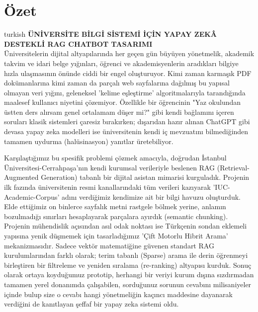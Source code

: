 \documentclass[12pt,a4paper]{report}
\newcommand{\projecttitle}{ÜNİVERSİTE BİLGİ SİSTEMİ İÇİN YAPAY ZEKÂ DESTEKLİ RAG CHATBOT TASARIMI}
\begin{document}
\chapter*{Özet}
\begin{otherlanguage*}{turkish}
\textbf{\projecttitle}\\[0.5cm]

Üniversitelerin dijital altyapılarında her geçen gün büyüyen yönetmelik, akademik takvim ve idari belge yığınları, öğrenci ve akademisyenlerin aradıkları bilgiye hızla ulaşmasının önünde ciddi bir engel oluşturuyor. Kimi zaman karmaşık PDF dokümanlarına kimi zaman da parçalı web sayfalarına dağılmış bu yapısal olmayan veri yığını, geleneksel 'kelime eşleştirme' algoritmalarıyla tarandığında maalesef kullanıcı niyetini çözemiyor. Özellikle bir öğrencinin "Yaz okulundan üstten ders alırsam genel ortalamam düşer mi?" gibi kendi bağlamını içeren soruları klasik sistemleri çaresiz bırakırken; dışarıdan hazır alınan ChatGPT gibi devasa yapay zeka modelleri ise üniversitenin kendi iç mevzuatını bilmediğinden tamamen uydurma (halüsinasyon) yanıtlar üretebiliyor.

Karşılaştığımız bu spesifik problemi çözmek amacıyla, doğrudan İstanbul Üniversitesi-Cerrahpaşa'nın kendi kurumsal verileriyle beslenen RAG (Retrieval-Augmented Generation) tabanlı bir dijital asistan mimarisi kurguladık. Projenin ilk fazında üniversitenin resmi kanallarındaki tüm verileri kazıyarak 'IUC-Academic-Corpus' adını verdiğimiz kendimize ait bir bilgi havuzu oluşturduk. Elde ettiğimiz on binlerce sayfalık metni rastgele bölmek yerine, anlamın bozulmadığı sınırları hesaplayarak parçalara ayırdık (semantic chunking). Projenin mühendislik açısından asıl odak noktası ise Türkçenin sondan eklemeli yapısına yenik düşmemek için tasarladığımız 'Çift Motorlu Hibrit Arama' mekanizmasıdır. Sadece vektör matematiğine güvenen standart RAG kurulumlarından farklı olarak; terim tabanlı (Sparse) arama ile derin öğrenmeyi birleştiren bir filtreleme ve yeniden sıralama (re-ranking) altyapısı kurduk. Sonuç olarak ortaya koyduğumuz prototip, herhangi bir veriyi kurum dışına sızdırmadan tamamen yerel donanımda çalışabilen, sorduğunuz sorunun cevabını milisaniyeler içinde bulup size o cevabı hangi yönetmeliğin kaçıncı maddesine dayanarak verdiğini de kanıtlayan şeffaf bir yapay zeka sistemi oldu.

\end{otherlanguage*}

\end{document}
